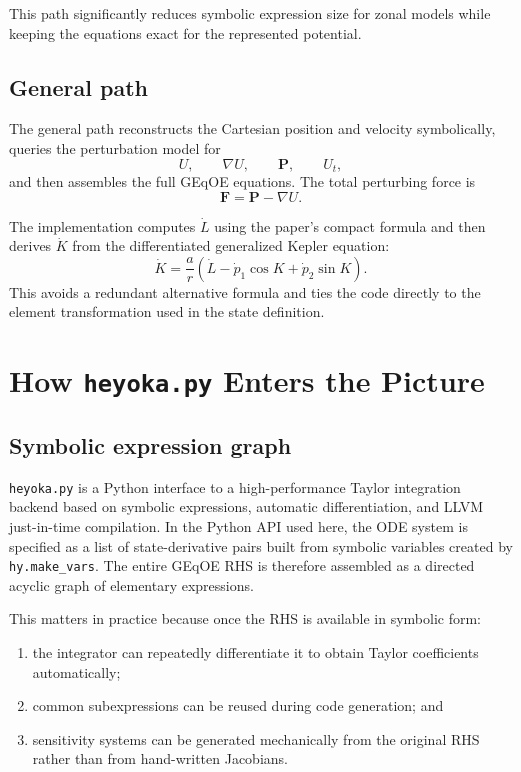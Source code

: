\documentclass[11pt]{article}
\begin{document}
This path significantly reduces symbolic expression size for zonal models while
keeping the equations exact for the represented potential.

\subsection{General path}

The general path reconstructs the Cartesian position and velocity symbolically,
queries the perturbation model for
\begin{equation}
U, \qquad \nabla U, \qquad \bm{P}, \qquad U_t,
\end{equation}
and then assembles the full GEqOE equations. The total perturbing force is
\begin{equation}
\bm{F} = \bm{P} - \nabla U.
\end{equation}

The implementation computes $\dot{L}$ using the paper's compact formula and
then derives $\dot{K}$ from the differentiated generalized Kepler equation:
\begin{equation}
\dot{K} = \frac{a}{r}\left( \dot{L} - \dot{p}_1 \cos K + \dot{p}_2 \sin K \right).
\end{equation}
This avoids a redundant alternative formula and ties the code directly to the
element transformation used in the state definition.

\section{How \texttt{heyoka.py} Enters the Picture}

\subsection{Symbolic expression graph}

\texttt{heyoka.py} is a Python interface to a high-performance Taylor
integration backend based on symbolic expressions, automatic differentiation,
and LLVM just-in-time compilation. In the Python API used here, the ODE system
is specified as a list of state-derivative pairs built from symbolic variables
created by \texttt{hy.make\_vars}. The entire GEqOE RHS is therefore assembled as
a directed acyclic graph of elementary expressions.

This matters in practice because once the RHS is available in symbolic form:
\begin{enumerate}
    \item the integrator can repeatedly differentiate it to obtain Taylor
    coefficients automatically;
    \item common subexpressions can be reused during code generation; and
    \item sensitivity systems can be generated mechanically from the original
    RHS rather than from hand-written Jacobians.
\end{enumerate}
\end{document}
